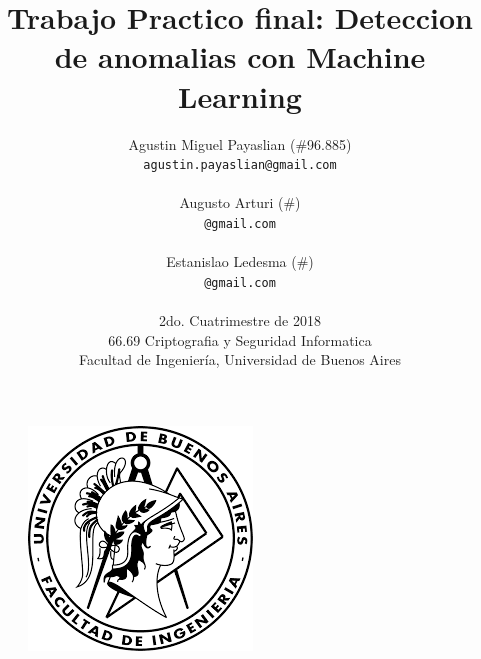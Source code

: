\documentclass[a4paper,10pt]{article}
\begin{document}
\pagestyle{fancy}
\fancyhf{}

\fancyfoot[R]{\thepage}


\title{\textbf{Trabajo Practico final: Deteccion de anomalias con Machine Learning}}



\author{Agustin Miguel Payaslian (\#96.885)\\
\texttt{agustin.payaslian@gmail.com}\\
\\
Augusto Arturi (\#)\\
\texttt{@gmail.com}\\
\\
Estanislao Ledesma (\#)\\
\texttt{@gmail.com}\\
\\
\vspace{5mm}
\normalsize{2do. Cuatrimestre de 2018}\\
\vspace{5mm}
\normalsize{66.69 Criptografia y Seguridad Informatica}\\
\vspace{5mm}
\normalsize{Facultad de Ingeniería, Universidad de Buenos Aires}\\
}
\date{}


\maketitle

\vspace{5mm}
\begin{figure}[!htp]
\centering
\includegraphics[scale=1]{Logo.png} 
\end{figure}
\vspace{5mm}
\end{document}
